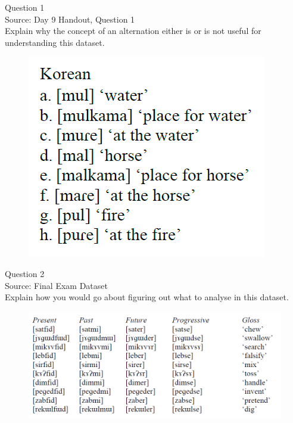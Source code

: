 \documentclass[12pt]{article}
\begin{document}
\begin{center}
\textbf{{\color{blue}{\HUGE START OF EXAM\\}}}

\textbf{{\color{blue}{\HUGE Student ID: 6427\\}}}

\textbf{{\color{blue}{\HUGE 9:50 - 10:10 AM\\}}}

\end{center}
\newpage

{\large Question 1}\\

Source: Day 9 Handout, Question 1\\

Explain why the concept of an alternation either is or is not useful for understanding this dataset.\\

\begin{figure}[H]
\includegraphics{../images/korean.png}
\end{figure}

\newpage

{\large Question 2}\\

Source: Final Exam Dataset\\

Explain how you would go about figuring out what to analyse in this dataset.\\

\begin{figure}[H]
\includegraphics{../images/final_dataset.png}
\end{figure}
\end{document}
